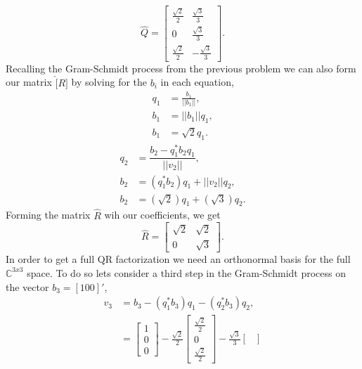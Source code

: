 \documentclass[12pt]{article}
\makeatletter
\theoremstyle{homework}
\newenvironment{exercise}[1]
{\def\@currentlabel{#1}\exercisecore}
{\endexercisecore}
\newcommand{\Cplx}{\ensuremath{\mathbb C}}
\let\CC\Cplx
\makeatother
\begin{document}
\begin{exercise}{7.1}
\begin{enumerate}
    \begin{equation*}
      \hat{Q} = 
      \begin{bmatrix}
        \frac{\sqrt{2}}{2} & \frac{\sqrt{3}}{3}\\
        0 & \frac{\sqrt{3}}{3}\\
        \frac{\sqrt{2}}{2} & -\frac{\sqrt{3}}{3}
      \end{bmatrix}.
    \end{equation*} 
    Recalling the Gram-Schmidt process from the previous problem we can also form our matrix $\hat[R]$ by solving for the $b_i$ in each equation,
    \begin{align*}
      q_1 &= \frac{b_1}{||b_1||},\\
      b_1 &= ||b_1||q_1,\\
      b_1 &= \sqrt{2}q_1.
    \end{align*}
    \begin{align*}
      q_2 &= \dfrac{b_2 - q_1^*b_2q_1}{||v_2||},\\
      b_2&= (q_1^*b_2)q_1 + ||v_2||q_2,\\
      b_2&= (\sqrt{2})q_1 + (\sqrt{3})q_2.
    \end{align*}
    Forming the matrix $\hat{R}$ wih our coefficients, we get
    \begin{equation*}
      \hat{R} = 
      \begin{bmatrix}
        \sqrt{2} & \sqrt{2}\\
        0 & \sqrt{3}
      \end{bmatrix}.
    \end{equation*}
    In order to get a full QR factorization we need an orthonormal basis for the full $\CC^{3x3}$ space. To do so lets consider a third step in the Gram-Schmidt process 
    on the vector $b_3 = [1 0 0]'$,
    \begin{align*}
      v_3 &= b_3 - (q_1^*b_3)q_1 - (q_2^*b_3)q_2,\\
      &= \begin{bmatrix}
        1\\
        0\\
        0
      \end{bmatrix}
      -\frac{\sqrt{2}}{2}
      \begin{bmatrix}
        \frac{\sqrt{2}}{2}\\
        0\\
        \frac{\sqrt{2}}{2}
      \end{bmatrix}
      -
      \frac{\sqrt{3}}{3}
      \begin{bmatrix}

\end{bmatrix}
\end{align*}
\end{enumerate}
\end{exercise}
\end{document}
